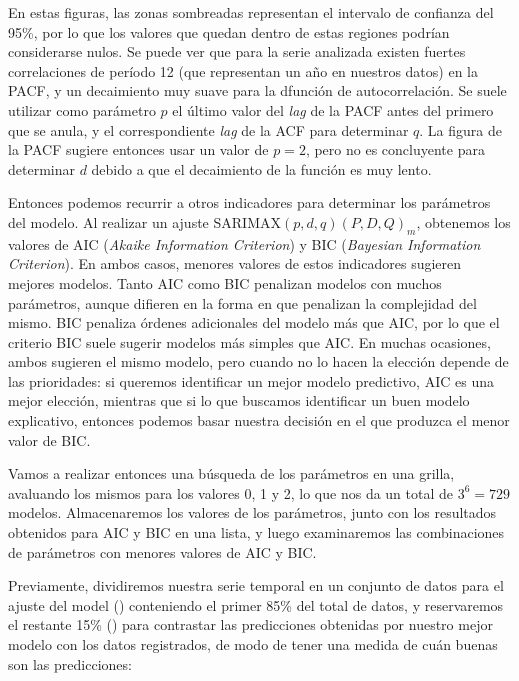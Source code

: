 
En estas figuras, las zonas sombreadas representan el intervalo de confianza del 95\%, por lo que los valores que quedan dentro de estas regiones podrían considerarse nulos. Se puede ver que para la serie analizada existen fuertes correlaciones de período 12 (que representan un año en nuestros datos) en la PACF, y un decaimiento muy suave para la dfunción de autocorrelación. Se suele utilizar como parámetro $p$ el último valor del \textit{lag} de la PACF antes del primero que se anula, y el correspondiente \textit{lag} de la ACF para determinar $q$. La figura de la PACF sugiere entonces usar un valor de $p=2$, pero no es concluyente para determinar $d$ debido a que el decaimiento de la función es muy lento.

Entonces podemos recurrir a otros indicadores para determinar los parámetros del modelo. Al realizar un ajuste SARIMAX$(p, d, q)(P, D, Q)_m$, obtenemos los valores de AIC (\textit{Akaike Information Criterion}) y BIC (\textit{Bayesian Information Criterion}). En ambos casos, menores valores de estos indicadores sugieren mejores modelos. Tanto AIC como BIC penalizan modelos con muchos parámetros, aunque difieren en la forma en que penalizan la complejidad del mismo. BIC penaliza órdenes adicionales del modelo más que AIC, por lo que el criterio BIC suele sugerir modelos más simples que AIC. En muchas ocasiones, ambos sugieren el mismo modelo, pero cuando no lo hacen la elección depende de las prioridades: si queremos identificar un mejor modelo predictivo, AIC es una mejor elección, mientras que si lo que buscamos identificar un buen modelo explicativo, entonces podemos basar nuestra decisión en el que produzca el menor valor de BIC.

Vamos a realizar entonces una búsqueda de los parámetros en una grilla, avaluando los mismos para los valores 0, 1 y 2, lo que nos da un total de $3^6 = 729$ modelos. Almacenaremos los valores de los parámetros, junto con los resultados obtenidos para AIC y BIC en una lista, y luego examinaremos las combinaciones de parámetros con menores valores de AIC y BIC. 

Previamente, dividiremos nuestra serie temporal en un conjunto de datos para el ajuste del model () conteniendo el primer 85\% del total de datos, y reservaremos el restante 15\% () para contrastar las predicciones obtenidas por nuestro mejor modelo con los datos registrados, de modo de tener una medida de cuán buenas son las predicciones:

